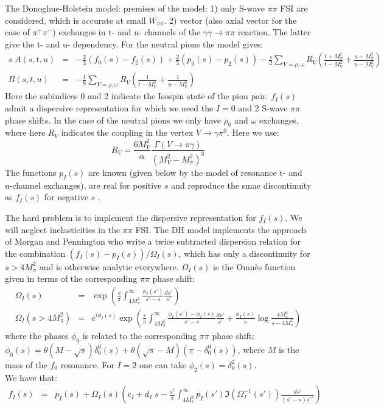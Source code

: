 \documentclass[12pt,epsfig]{article}
\newcommand{\beq}{\begin{equation}}
\newcommand{\eeq}{\end{equation}}
\newcommand{\bea}{\begin{eqnarray}}
\newcommand{\eea}{\end{eqnarray}}
\begin{document}
The Donoghue-Holstein model:  premises of the model: 1) only S-wave $\pi \pi$ FSI are considered, which is accurate at small $W_{\pi\pi}$. 2)  vector (also axial vector for the case of $\pi^+\pi^-$) exchanges in t- and u- channels of the $\gamma\gamma\to\pi\pi$ reaction. The latter give the t- and u- dependency.
For the neutral pions the model gives:
\bea
s\;A(s,t,u)&=& -\frac 23(f_0(s)-f_2(s))+\frac 23 (p_0(s)-p_2(s))-\frac s 2\sum_{V=\rho,\omega} R_V (\frac{t+M_\pi^2}{t-M_V^2}+\frac{u+M_\pi^2}{u-M_V^2})\nonumber\\
B(s,t,u)&=&-\frac 18 \sum_{V=\rho,\omega} R_V (\frac{1}{t-M_V^2}+\frac{1}{u-M_V^2})
\eea
Here the subindices 0 and 2 indicate the Isospin state of the pion pair. $f_I(s)$ admit a dispersive representation  for which we need the $I=0$ and 2 S-wave $\pi\pi$ phase shifts.
In the case of the neutral pions we only have $\rho_0$ and $\omega$ exchanges, where here $R_V$ indicates the coupling in the vertex $V\to \gamma \pi^0$.
Here we use:
\beq
R_V=\frac{6 M_V^2}{\alpha} \frac{\Gamma(V\to \pi \gamma)}{(M_V^2-M_\pi^2)^3}
\eeq
The functions $p_I(s)$ are known (given below by the model of resonance t- and u-channel exchanges), are real for positive $s$ and reproduce the smae discontinuity as $f_I(s)$ for negative $s$ . 

The hard problem is to implement the dispersive representation for $f_I(s)$. We will neglect inelasticities in the $\pi \pi$ FSI.
The DH model implements the approach of Morgan and Pennington who write a twice subtracted  dispersion relation for the combination $(f_I(s)-p_I(s))/\Omega_I(s)$, which has only a discontinuity for $s>4 M_\pi^2$ and is otherwise analytic everywhere. $\Omega_I(s)$ is the Omn\`es function given in terms of the corresponding $\pi\pi$ phase shift:
\bea
\Omega_I(s)&=&\exp\left(\frac s\pi\int_{4 M_\pi^2}^\infty \frac{\phi_I(s') }{s'-s} \frac{ds'}{s'}\right)\nonumber\\
\Omega_I(s>4 M_\pi^2)&=&e^{i\phi_I(s)} \exp\left(\frac s\pi\int_{4 M_\pi^2}^\infty \frac{\phi_I(s')-\phi_I(s)}{s'-s} \frac{ds'}{s'}+\frac{\phi_I(s)}{\pi}\log\frac{4M_\pi^2}{s-4M_\pi^2}\right)
\eea
where the phases $\phi_0$ is related to the corresponding $\pi\pi$ phase shift: $\phi_0(s)=\theta(M-\sqrt{s}) \delta_0^0(s)+\theta( \sqrt{s}-M)(\pi-\delta_0^0(s))$, where $M$ is the mass of the $f_0$ resonance. For $I=2$ one can take $\phi_2(s)=\delta_0^2(s)$.\\
We have that:
\bea
f_I(s)&=& p_I(s)+\Omega_I(s)\left(c_I+d_I\;s-\frac{s^2}{\pi} \int_{4M_\pi^2}^\infty p_I(s') \Im(\Omega_I^{-1}(s'))\frac {ds'} {(s'-s) s'^2}\right)
\eea
\end{document}
